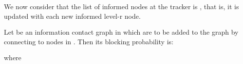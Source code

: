 We now consider that the list of informed nodes at the tracker is , that is, it is updated with each new informed level-r node.

\begin{theorem}\label{th:2}

Let  be an information contact graph in which  are to be added to the graph by connecting to nodes in . Then its blocking probability  is:

\vspace{-0.5cm}


where

\vspace{-1.1cm}


\vspace{0.05cm}

\end{theorem}

